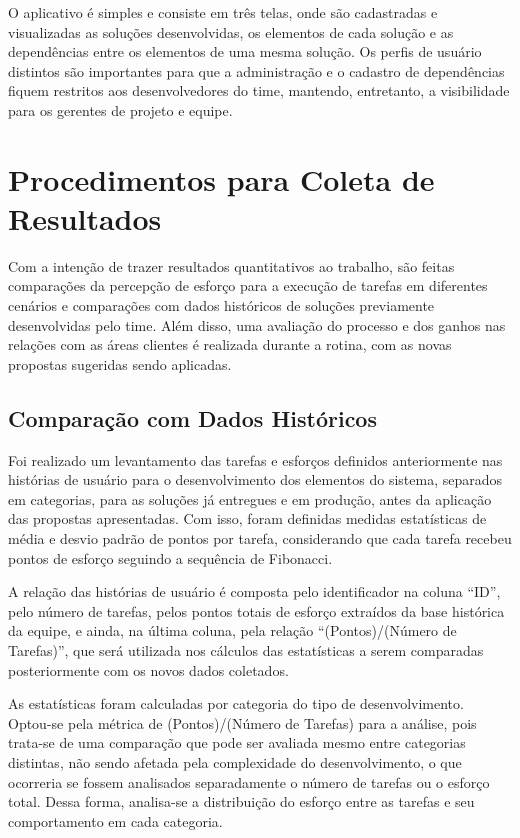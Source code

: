 	O aplicativo é simples e consiste em três telas, onde são cadastradas e visualizadas as soluções desenvolvidas, os elementos de cada solução e as dependências entre os elementos de uma mesma solução. Os perfis de usuário distintos são importantes para que a administração e o cadastro de dependências fiquem restritos aos desenvolvedores do time, mantendo, entretanto, a visibilidade para os gerentes de projeto e equipe.

	\section{Procedimentos para Coleta de Resultados}

	Com a intenção de trazer resultados quantitativos ao trabalho, são feitas comparações da percepção de esforço para a execução de tarefas em diferentes cenários e comparações com dados históricos de soluções previamente desenvolvidas pelo time. Além disso, uma avaliação do processo e dos ganhos nas relações com as áreas clientes é realizada durante a rotina, com as novas propostas sugeridas sendo aplicadas.

	\subsection{Comparação com Dados Históricos}

	Foi realizado um levantamento das tarefas e esforços definidos anteriormente nas histórias de usuário para o desenvolvimento dos elementos do sistema, separados em categorias, para as soluções já entregues e em produção, antes da aplicação das propostas apresentadas. Com isso, foram definidas medidas estatísticas de média e desvio padrão de pontos por tarefa, considerando que cada tarefa recebeu pontos de esforço seguindo a sequência de Fibonacci.

	A relação das histórias de usuário é composta pelo identificador na coluna ``ID'', pelo número de tarefas, pelos pontos totais de esforço extraídos da base histórica da equipe, e ainda, na última coluna, pela relação ``(Pontos)/(Número de Tarefas)'', que será utilizada nos cálculos das estatísticas a serem comparadas posteriormente com os novos dados coletados.

	As estatísticas foram calculadas por categoria do tipo de desenvolvimento. Optou-se pela métrica de (Pontos)/(Número de Tarefas) para a análise, pois trata-se de uma comparação que pode ser avaliada mesmo entre categorias distintas, não sendo afetada pela complexidade do desenvolvimento, o que ocorreria se fossem analisados separadamente o número de tarefas ou o esforço total. Dessa forma, analisa-se a distribuição do esforço entre as tarefas e seu comportamento em cada categoria.

